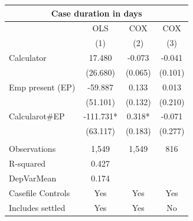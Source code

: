 \begin{tabular}{lccc}
\toprule
\multicolumn{4}{c}{Case duration in days} \\
\midrule
      & OLS   & COX   & COX \\
\midrule
      & (1)   & (2)   & (3) \\
\midrule
Calculator & 17.480 & -0.073 & -0.041 \\
      & (26.680) & (0.065) & (0.101) \\
Emp present (EP) & -59.887 & 0.133 & 0.013 \\
      & (51.101) & (0.132) & (0.210) \\
Calcularot\#EP & -111.731* & 0.318* & -0.071 \\
      & (63.117) & (0.183) & (0.277) \\
      &       &       &  \\
\midrule
Observations  & 1,549 & 1,549 & 816 \\
R-squared & 0.427 &       &  \\
DepVarMean & 0.174 &       &  \\
Casefile Controls & Yes   & Yes   & Yes \\
Includes settled & Yes   & Yes   & No \\
\bottomrule
\bottomrule
\end{tabular}%
